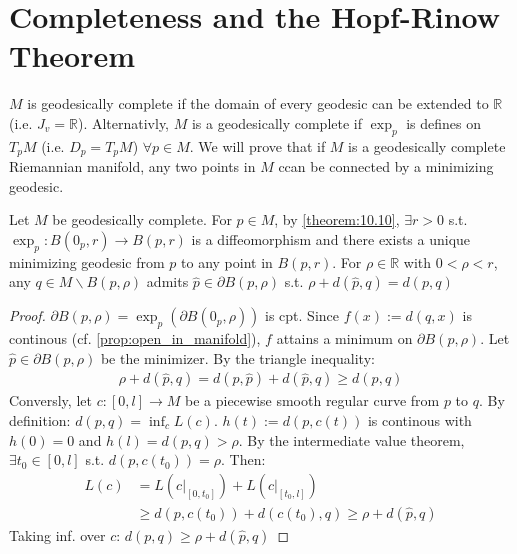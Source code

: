 \section{Completeness and the Hopf-Rinow Theorem}

\begin{definition}
    $M$ is geodesically complete if  the domain of every geodesic can be extended to $\mathbb{R}$ (i.e. $J_v = \mathbb{R}$).
    Alternativly, $M$ is a geodesically complete if $\exp_p$ is defines on $T_pM$ (i.e. $D_p = T_pM$) $\forall p \in M$.
    We will prove that if $M$ is a geodesically complete Riemannian manifold, any two points in $M$ ccan be connected by a minimizing geodesic.
    \label{def:11.1}
\end{definition}

\begin{lemma}\label{lemma:11.2}
    Let $M$ be geodesically complete.
    For $p \in M$, by \autoref{theorem:10.10}, $\exists r >0$ s.t.
    $\exp_p : B(0_p, r) \to B(p,r)$ is a diffeomorphism and there exists a unique minimizing geodesic from $p$ to any point in $B(p,r)$.
    For $\rho \in \mathbb{R}$ with $0<\rho<r$, any $q \in M \backslash  B(p,\rho)$
    admits $\hat{p} \in \partial B(p,\rho)$ s.t. $\rho + d(\hat{p}, q) = d(p,q)$
\end{lemma}

\begin{proof}
    $\partial B(p,\rho)= \exp_p (\partial B(0_p,\rho))$ is cpt.
    Since $f(x) := d(q,x)$ is continous (cf. \autoref{prop:open_in_manifold}),
    $f$ attains a minimum on $\partial B(p,\rho)$. Let $\hat{p} \in \partial B(p,\rho)$
    be the minimizer. By the triangle inequality:
    \[
    \begin{aligned}
        \rho + d(\hat{p}, q) = d(p,\hat{p}) + d(\hat{p},q) \geq d(p,q)
    \end{aligned}
    \]
    Conversly, let $c:[0,l] \to M$ be a piecewise smooth regular curve from $p$ to $q$. By definition: $d(p,q) = \inf_c L(c)$.
    $h(t) := d(p, c(t))$ is continous with $h(0) =0$ and $h(l) = d(p,q) > \rho$.
    By the intermediate value theorem, $\exists t_0 \in [0,l]$ s.t. $d(p,c(t_0)) = \rho$. Then:
    \[
    \begin{aligned}
        L(c) &= L(c|_{[0,t_0]}) + L(c|_{[t_0,l]}) \\
        &\geq d(p,c(t_0)) + d(c(t_0),q) \geq \rho + d(\hat{p},q)
    \end{aligned}
    \]
    Taking inf. over $c$: $d(p,q) \geq \rho + d(\hat{p}, q)$
\end{proof}

